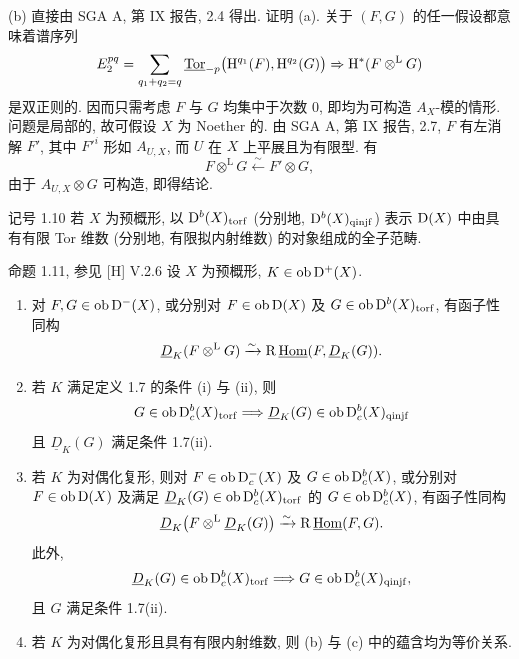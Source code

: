\begin{prooftext}
(b) 直接由 SGA A, 第 IX 报告, 2.4 得出. 证明 (a). 关于 $(F,G)$ 的任一假设都意味着谱序列
\[
   E_2^{pq}=\sum_{q_1+q_2=q}\underline{\operatorname{Tor}}_{-p}\bigl(\mathrm{H}^{q_1}(F),\mathrm{H}^{q_2}(G)\bigr)
       \Rightarrow \mathrm{H}^*(F\otimes^{\mathrm L}G)
\]
是双正则的. 因而只需考虑 $F$ 与 $G$ 均集中于次数 $0$, 即均为可构造 $A_X$-模的情形. 问题是局部的, 故可假设 $X$ 为 Noether 的. 由 SGA A, 第 IX 报告, 2.7, $F$ 有左消解 $F'$, 其中 $F'^i$ 形如 $A_{U,X}$, 而 $U$ 在 $X$ 上平展且为有限型. 有
\[
   F\otimes^{\mathrm L}G\xleftarrow{\sim}F'\otimes G,
\]
由于 $A_{U,X}\otimes G$ 可构造, 即得结论. \qedtext
\end{prooftext}

\begin{statement}{记号 1.10}
若 $X$ 为预概形, 以 $\mathrm{D}^b(X)_{\mathrm{torf}}$ (分别地, $\mathrm{D}^b(X)_{\mathrm{qinjf}}$) 表示 $\mathrm{D}(X)$ 中由具有有限 Tor 维数 (分别地, 有限拟内射维数) 的对象组成的全子范畴.
\end{statement}

\begin{statement}{命题 1.11, 参见 [H] V.2.6}
设 $X$ 为预概形, $K\in\operatorname{ob}\mathrm{D}^+(X)$.
\begin{enumerate}[label=\alph*)]
\item 对 $F,G\in\operatorname{ob}\mathrm{D}^-(X)$, 或分别对 $F\in\operatorname{ob}\mathrm{D}(X)$ 及 $G\in\operatorname{ob}\mathrm{D}^b(X)_{\mathrm{torf}}$, 有函子性同构
\[
   \underline D_K(F\otimes^{\mathrm L}G)\xrightarrow{\sim}
   \mathrm R\,\underline{\operatorname{Hom}}(F,\underline D_K(G)).
\]

\item 若 $K$ 满足定义 1.7 的条件 (i) 与 (ii), 则
\[
   G\in\operatorname{ob}\mathrm{D}_c^b(X)_{\mathrm{torf}}
   \Longrightarrow
   \underline D_K(G)\in\operatorname{ob}\mathrm{D}_c^b(X)_{\mathrm{qinjf}}
\]
且 $\underline D_K(G)$ 满足条件 1.7(ii).

\item 若 $K$ 为对偶化复形, 则对 $F\in\operatorname{ob}\mathrm{D}_c^-(X)$ 及 $G\in\operatorname{ob}\mathrm{D}_c^b(X)$, 或分别对 $F\in\operatorname{ob}\mathrm{D}(X)$ 及满足 $\underline D_K(G)\in\operatorname{ob}\mathrm{D}_c^b(X)_{\mathrm{torf}}$ 的 $G\in\operatorname{ob}\mathrm{D}_c^b(X)$, 有函子性同构
\[
   \underline D_K\bigl(F\otimes^{\mathrm L}\underline D_K(G)\bigr)
      \xrightarrow{\sim}\mathrm R\,\underline{\operatorname{Hom}}(F,G).
\]
此外,
\[
   \underline D_K(G)\in\operatorname{ob}\mathrm{D}_c^b(X)_{\mathrm{torf}}
   \Longrightarrow
   G\in\operatorname{ob}\mathrm{D}_c^b(X)_{\mathrm{qinjf}},
\]
且 $G$ 满足条件 1.7(ii).

\item 若 $K$ 为对偶化复形且具有有限内射维数, 则 (b) 与 (c) 中的蕴含均为等价关系.
\end{enumerate}
\end{statement}


